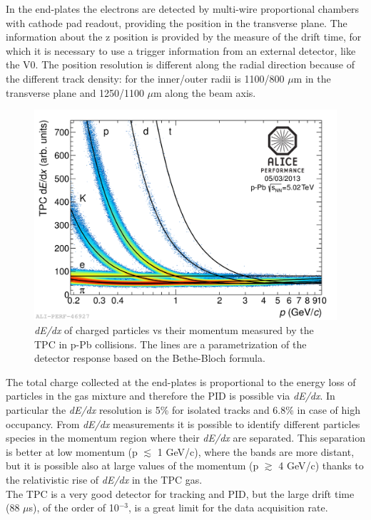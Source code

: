 In the end-plates the electrons are detected by multi-wire proportional chambers with cathode pad readout, providing the position in the transverse plane. The information about the z position is provided by the measure of the drift time, for which it is necessary to use a trigger information from an external detector, like the V0. The position resolution is different  along the radial direction because of the different track density: for the inner/outer radii is 1100/800 $\mu$m in the transverse plane and 1250/1100 $\mu$m along the beam axis.
%
\begin{figure}
  \centering
  \includegraphics[scale=0.15]{figures/TPC_Perf.png}
  \caption{\textit{dE/dx} of charged particles vs their momentum measured by the TPC in p-Pb collisions. The lines are a parametrization of the detector response based on the Bethe-Bloch formula.}
  \label{fig:TPC_Perf}
\end{figure}
%
The total charge collected at the end-plates is proportional to the energy loss of particles in the gas mixture and therefore the PID is possible via \textit{dE/dx}. In particular the \textit{dE/dx} resolution is 5\% for isolated tracks and 6.8\% in case of high occupancy. From \textit{dE/dx} measurements it is possible to identify different particles species in the momentum region where their \textit{dE/dx} are separated. This separation is better at low momentum (p $\lesssim$ 1 GeV/c), where the bands are more distant, but it is possible also at large values of the momentum (p $\gtrsim$ 4 GeV/c) thanks to the relativistic rise of \textit{dE/dx} in the TPC gas.\\
The TPC is a very good detector for tracking and PID, but the large drift time (88 $\mu$s), of the order of 10$^{-3}$, is a great limit for the data acquisition rate.\\
